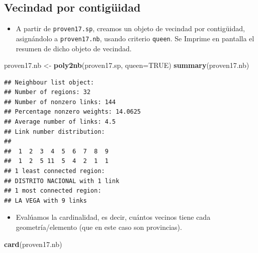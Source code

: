 \documentclass[11pt,]{article}
\newenvironment{Shaded}{\begin{snugshade}}{\end{snugshade}}
\newcommand{\KeywordTok}[1]{\textcolor[rgb]{0.13,0.29,0.53}{\textbf{#1}}}
\newcommand{\DataTypeTok}[1]{\textcolor[rgb]{0.13,0.29,0.53}{#1}}
\newcommand{\StringTok}[1]{\textcolor[rgb]{0.31,0.60,0.02}{#1}}
\newcommand{\OtherTok}[1]{\textcolor[rgb]{0.56,0.35,0.01}{#1}}
\newcommand{\OperatorTok}[1]{\textcolor[rgb]{0.81,0.36,0.00}{\textbf{#1}}}
\newcommand{\NormalTok}[1]{#1}
\providecommand{\tightlist}{%
\setlength{\itemsep}{0pt}\setlength{\parskip}{0pt}}
\begin{document}
\begin{Shaded}
\end{Shaded}

\subsection{Vecindad por contigüidad}\label{vecindad-por-contiguxfcidad}

\begin{itemize}
\tightlist
\item
  A partir de \texttt{proven17.sp}, creamos un objeto de vecindad por
  contigüidad, asignándolo a \texttt{proven17.nb}, usando criterio
  \texttt{queen}. Se Imprime en pantalla el resumen de dicho objeto de
  vecindad.
\end{itemize}

\begin{Shaded}
\begin{Highlighting}[]
\NormalTok{proven17.nb <-}\StringTok{ }\KeywordTok{poly2nb}\NormalTok{(proven17.sp, }\DataTypeTok{queen=}\OtherTok{TRUE}\NormalTok{)}
\KeywordTok{summary}\NormalTok{(proven17.nb)}
\end{Highlighting}
\end{Shaded}

\begin{verbatim}
## Neighbour list object:
## Number of regions: 32 
## Number of nonzero links: 144 
## Percentage nonzero weights: 14.0625 
## Average number of links: 4.5 
## Link number distribution:
## 
##  1  2  3  4  5  6  7  8  9 
##  1  2  5 11  5  4  2  1  1 
## 1 least connected region:
## DISTRITO NACIONAL with 1 link
## 1 most connected region:
## LA VEGA with 9 links
\end{verbatim}

\begin{itemize}
\tightlist
\item
  Evalúamos la cardinalidad, es decir, cuántos vecinos tiene cada
  geometría/elemento (que en este caso son provincias).
\end{itemize}

\begin{Shaded}
\begin{Highlighting}[]
\KeywordTok{card}\NormalTok{(proven17.nb)}
\end{Highlighting}
\end{Shaded}
\end{document}

